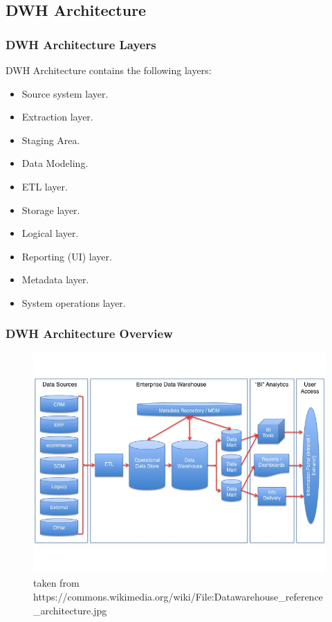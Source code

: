 \subsection{DWH Architecture}
\begin{frame}
\frametitle{DWH Architecture Layers}

\begin{wideitemize}
	\item DWH Architecture contains the following layers:
	\begin{itemize}[<+->]
		\item Source system layer.
		\item Extraction layer.
		\item Staging Area.
		\item Data Modeling.
		\item ETL layer.
		\item Storage layer.
		\item Logical layer.
		\item Reporting (UI) layer.
		\item Metadata layer.
		\item System operations layer.
	\end{itemize}	
\end{wideitemize}

\end{frame}

\begin{frame}
\frametitle{DWH Architecture Overview}
\begin{figure}[ht]
	\centering
	\includegraphics[width=.9\linewidth,height=.8\textheight]{./Figures/chapter-01/Datawarehouse_reference_architecture.jpg}
	\caption{taken from https://commons.wikimedia.org/wiki/File:Datawarehouse\_reference\_architecture.jpg}
\end{figure}
\end{frame}

